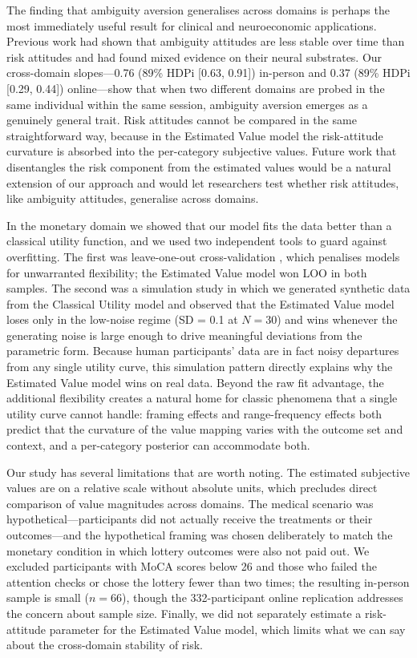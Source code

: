 \documentclass[11pt]{article}
\begin{document}
The finding that ambiguity aversion generalises across domains is perhaps the most immediately useful result for clinical and neuroeconomic applications. Previous work had shown that ambiguity attitudes are less stable over time than risk attitudes \citep{jia2020learning} and had found mixed evidence on their neural substrates. Our cross-domain slopes---0.76 (89\% HDPi [0.63, 0.91]) in-person and 0.37 (89\% HDPi [0.29, 0.44]) online---show that when two different domains are probed in the same individual within the same session, ambiguity aversion emerges as a genuinely general trait. Risk attitudes cannot be compared in the same straightforward way, because in the Estimated Value model the risk-attitude curvature is absorbed into the per-category subjective values. Future work that disentangles the risk component from the estimated values would be a natural extension of our approach and would let researchers test whether risk attitudes, like ambiguity attitudes, generalise across domains.

In the monetary domain we showed that our model fits the data better than a classical utility function, and we used two independent tools to guard against overfitting. The first was leave-one-out cross-validation \citep{vehtari2017loo}, which penalises models for unwarranted flexibility; the Estimated Value model won LOO in both samples. The second was a simulation study in which we generated synthetic data from the Classical Utility model and observed that the Estimated Value model loses only in the low-noise regime (SD = 0.1 at $N=30$) and wins whenever the generating noise is large enough to drive meaningful deviations from the parametric form. Because human participants' data are in fact noisy departures from any single utility curve, this simulation pattern directly explains why the Estimated Value model wins on real data. Beyond the raw fit advantage, the additional flexibility creates a natural home for classic phenomena that a single utility curve cannot handle: framing effects \citep{kahneman1979prospect} and range-frequency effects \citep{parducci1965range} both predict that the curvature of the value mapping varies with the outcome set and context, and a per-category posterior can accommodate both.

Our study has several limitations that are worth noting. The estimated subjective values are on a relative scale without absolute units, which precludes direct comparison of value magnitudes across domains. The medical scenario was hypothetical---participants did not actually receive the treatments or their outcomes---and the hypothetical framing was chosen deliberately to match the monetary condition in which lottery outcomes were also not paid out. We excluded participants with MoCA scores below 26 \citep{nasreddine2005moca} and those who failed the attention checks or chose the lottery fewer than two times; the resulting in-person sample is small ($n=66$), though the 332-participant online replication addresses the concern about sample size. Finally, we did not separately estimate a risk-attitude parameter for the Estimated Value model, which limits what we can say about the cross-domain stability of risk.
\end{document}
